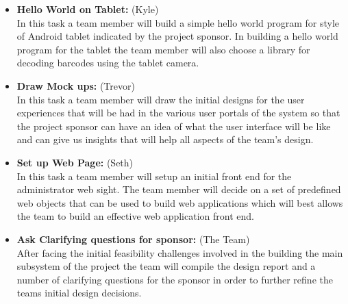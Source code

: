 \documentclass[Letter,11pt]{article}
\begin{document}
\begin{itemize}
			\item\textbf{Hello World on Tablet:} (Kyle)\\
			In this task a team member will build a simple hello world program for style of Android tablet indicated by the project sponsor. In building a hello world program for the tablet the team member will also choose a library for decoding barcodes using the tablet camera. 
			
			\item\textbf{Draw Mock ups:} (Trevor)\\
			In this task a team member will draw the initial designs for the user experiences that will be had in the various user portals of the system so that the project sponsor can have an idea of what the user interface will be like and can give us insights that will help all aspects of the team's design. 
			
			\item\textbf{Set up Web Page:} (Seth)\\
			In this task a team member will setup an initial front end for the administrator web sight. The team member will decide on a set of predefined web objects that can be used to build web applications which will best allows the team to build an effective web application front end. 
			
			\item\textbf{Ask Clarifying questions for sponsor:} (The Team)\\
			After facing the initial feasibility challenges involved in the building the main subsystem of the project the team will compile the design report and a number of clarifying questions for the sponsor in order to further refine the teams initial design decisions. 
		\end{itemize}
		
		
		
\end{document}

